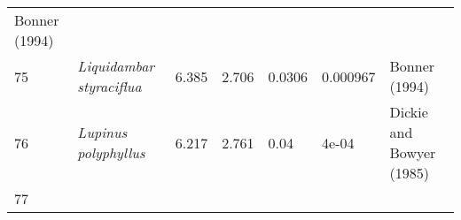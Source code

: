 \documentclass[]{article}
\begin{document}
\begin{longtable}[]{@{}lllllll@{}}
\begin{minipage}[t]{0.23\columnwidth}
Bonner (1994)\strut
\end{minipage}\tabularnewline
\begin{minipage}[t]{0.05\columnwidth}\raggedright
75\strut
\end{minipage} & \begin{minipage}[t]{0.23\columnwidth}\raggedright
\emph{Liquidambar styraciflua}\strut
\end{minipage} & \begin{minipage}[t]{0.05\columnwidth}\raggedright
6.385\strut
\end{minipage} & \begin{minipage}[t]{0.08\columnwidth}\raggedright
2.706\strut
\end{minipage} & \begin{minipage}[t]{0.08\columnwidth}\raggedright
0.0306\strut
\end{minipage} & \begin{minipage}[t]{0.08\columnwidth}\raggedright
0.000967\strut
\end{minipage} & \begin{minipage}[t]{0.23\columnwidth}\raggedright
Bonner (1994)\strut
\end{minipage}\tabularnewline
\begin{minipage}[t]{0.05\columnwidth}\raggedright
76\strut
\end{minipage} & \begin{minipage}[t]{0.23\columnwidth}\raggedright
\emph{Lupinus polyphyllus}\strut
\end{minipage} & \begin{minipage}[t]{0.05\columnwidth}\raggedright
6.217\strut
\end{minipage} & \begin{minipage}[t]{0.08\columnwidth}\raggedright
2.761\strut
\end{minipage} & \begin{minipage}[t]{0.08\columnwidth}\raggedright
0.04\strut
\end{minipage} & \begin{minipage}[t]{0.08\columnwidth}\raggedright
4e-04\strut
\end{minipage} & \begin{minipage}[t]{0.23\columnwidth}\raggedright
Dickie and Bowyer (1985)\strut
\end{minipage}\tabularnewline
\begin{minipage}[t]{0.05\columnwidth}\raggedright
77\strut
\end{minipage} & \begin{minipage}[t]{0.23\columnwidth}\raggedright

\end{minipage}
\end{longtable}
\end{document}
